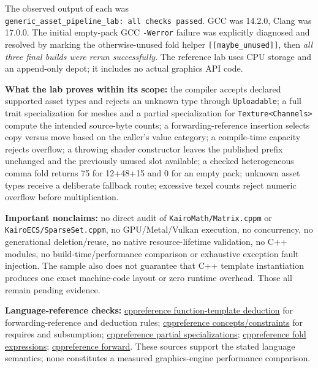 The observed output of each was \texttt{generic\_asset\_pipeline\_lab:\ all\ checks\ passed}. GCC was 14.2.0, Clang was 17.0.0. The initial empty-pack GCC \texttt{-Werror} failure was explicitly diagnosed and resolved by marking the otherwise-unused fold helper \texttt{{[}{[}maybe\_unused{]}{]}}, then \emph{all three final builds were rerun successfully}. The reference lab uses CPU storage and an append-only depot; it includes no actual graphics API code.

\textbf{What the lab proves within its scope:} the compiler accepts declared supported asset types and rejects an unknown type through \texttt{Uploadable}; a full trait specialization for meshes and a partial specialization for \texttt{Texture\textless{}Channels\textgreater{}} compute the intended source-byte counts; a forwarding-reference insertion selects copy versus move based on the caller's value category; a compile-time capacity rejects overflow; a throwing shader constructor leaves the published prefix unchanged and the previously unused slot available; a checked heterogeneous comma fold returns 75 for 12+48+15 and 0 for an empty pack; unknown asset types receive a deliberate fallback route; excessive texel counts reject numeric overflow before multiplication.

\textbf{Important nonclaims:} no direct audit of \texttt{KairoMath/Matrix.cppm} or \texttt{KairoECS/SparseSet.cppm}, no GPU/Metal/Vulkan execution, no concurrency, no generational deletion/reuse, no native resource-lifetime validation, no C++ modules, no build-time/performance comparison or exhaustive exception fault injection. The sample also does not guarantee that C++ template instantiation produces one exact machine-code layout or zero runtime overhead. Those all remain pending evidence.

\textbf{Language-reference checks:} \href{https://en.cppreference.com/w/cpp/language/template_argument_deduction}{cppreference function-template deduction} for forwarding-reference and deduction rules; \href{https://en.cppreference.com/w/cpp/language/constraints}{cppreference concepts/constraints} for requires and subsumption; \href{https://en.cppreference.com/w/cpp/language/partial_specialization}{cppreference partial specializations}; \href{https://en.cppreference.com/w/cpp/language/fold}{cppreference fold expressions}; \href{https://en.cppreference.com/w/cpp/utility/forward}{cppreference forward}. These sources support the stated language semantics; none constitutes a measured graphics-engine performance comparison.

